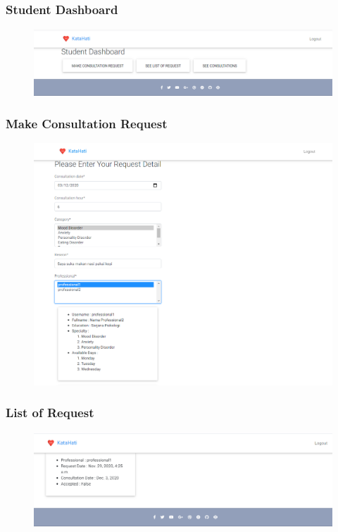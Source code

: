 \documentclass{article}
\begin{document}
	\subsubsection{Student Dashboard}
	\begin{figure}[H]
		\centering
		\includegraphics[width=480px]{Student Dashboard.png}
	\end{figure}

	\subsubsection{Make Consultation Request}
	\begin{figure}[H]
		\centering
		\includegraphics[width=480px]{Consultation Request.png}
	\end{figure}

	\subsubsection{List of Request}
	\begin{figure}[H]
		\centering
		\includegraphics[width=480px]{Request List.png}
	\end{figure}
\end{document}

